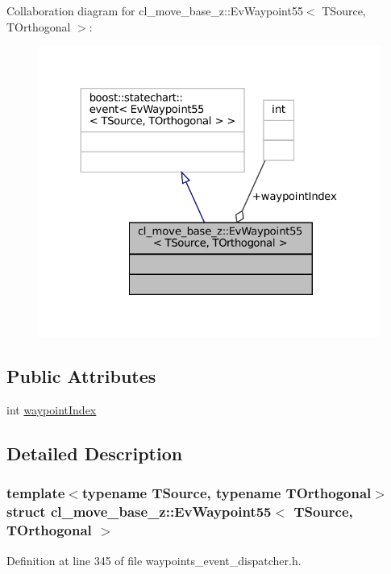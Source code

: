 Collaboration diagram for cl\+\_\+move\+\_\+base\+\_\+z\+:\+:Ev\+Waypoint55$<$ T\+Source, T\+Orthogonal $>$\+:
\nopagebreak
\begin{figure}[H]
\begin{center}
\leavevmode
\includegraphics[width=324pt]{structcl__move__base__z_1_1EvWaypoint55__coll__graph}
\end{center}
\end{figure}
\subsection*{Public Attributes}
\begin{DoxyCompactItemize}
\item 
int \hyperlink{structcl__move__base__z_1_1EvWaypoint55_aba8b7d968f89a9564deb7a023bf5798f}{waypoint\+Index}
\end{DoxyCompactItemize}


\subsection{Detailed Description}
\subsubsection*{template$<$typename T\+Source, typename T\+Orthogonal$>$\newline
struct cl\+\_\+move\+\_\+base\+\_\+z\+::\+Ev\+Waypoint55$<$ T\+Source, T\+Orthogonal $>$}



Definition at line 345 of file waypoints\+\_\+event\+\_\+dispatcher.\+h.



